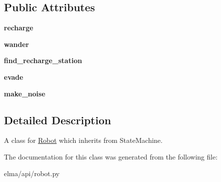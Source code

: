 \subsection*{Public Attributes}
\begin{DoxyCompactItemize}
\item 
\mbox{\label{classelma_1_1api_1_1robot_1_1Robot_ab1fa357b053ae9c5a0619689698e9bbc}} 
{\bfseries recharge}
\item 
\mbox{\label{classelma_1_1api_1_1robot_1_1Robot_ad527326117d39ba9cad2d3673df59ca6}} 
{\bfseries wander}
\item 
\mbox{\label{classelma_1_1api_1_1robot_1_1Robot_a6b9bc3b5714ccfadf434c266e6f42639}} 
{\bfseries find\+\_\+recharge\+\_\+station}
\item 
\mbox{\label{classelma_1_1api_1_1robot_1_1Robot_a31f1c867344f45e87b6dfe9d958d13dd}} 
{\bfseries evade}
\item 
\mbox{\label{classelma_1_1api_1_1robot_1_1Robot_a7314c2483ca6d96cf75016cb4e7cf43e}} 
{\bfseries make\+\_\+noise}
\end{DoxyCompactItemize}


\subsection{Detailed Description}
A class for \hyperlink{classelma_1_1api_1_1robot_1_1Robot}{Robot} which inherits from State\+Machine. 



The documentation for this class was generated from the following file\+:\begin{DoxyCompactItemize}
\item 
elma/api/robot.\+py\end{DoxyCompactItemize}
